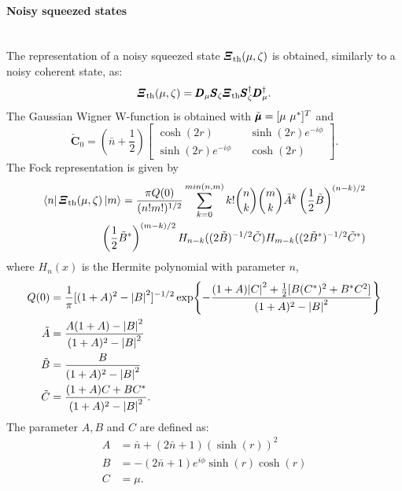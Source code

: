         \paragraph{Noisy squeezed states}\mbox{} \\
        The representation of a noisy squeezed state $\Operator{\varXi}_{\mathrm{th}}(\mu,\zeta)$ is obtained,
        similarly to a noisy coherent state, as:
        \begin{equation}
            \Operator{\varXi}_{\mathrm{th}}(\mu,\zeta)=\Operator{D}_\mu\Operator{S}_\zeta\Operator{\varXi}_{\mathrm{th}}
            \Operator{S}_\zeta^\dagger\Operator{D}_\mu^\dagger.
        \end{equation}
        The Gaussian Wigner W-function is obtained with $\check{\Vector{\mu}}=[\mu\ \mu^*]^T$ and
        \begin{equation}
            \check{\pmb{C}}_0=\left(\bar{n}+\frac{1}{2}\right)
            \begin{bmatrix}
                \cosh(2r) && \sinh(2r)e^{-i\phi}\\
                \sinh(2r)e^{-i\phi} && \cosh(2r)
            \end{bmatrix}.
            \label{eq:WignerSS}
        \end{equation}
        The Fock representation is given by \cite{MarMar_1993}
        \begin{equation}\begin{split}
            \bra{n}\Operator{\varXi}_{\mathrm{th}}(\mu,\zeta)\ket{m}=\frac{\pi Q(0)}{(n!m!)^{1/2}}
            \sum_{k=0}^{min(n,m)} k! \binom{n}{k}\binom{m}{k} \tilde{A}^k\left(\frac{1}{2}
            \tilde{B}\right)^{(n-k)/2}\\ \left(\frac{1}{2}\tilde{B}^*\right)^{(m-k)/2}
            H_{n-k}((2\tilde{B})^{-1/2}\tilde{C}) H_{m-k}((2\tilde{B}^*)^{-1/2}\tilde{C}^*) 
            \label{FR_NSS}
        \end{split}\end{equation}
        where $H_n(x)$ is the Hermite polynomial with parameter $n$,
        \begin{equation}
            \begin{split}
            Q(0) &= \frac{1}{\pi}[(1+A)^2-\absolutevalue{B}^2]^{-1/2}\exp{-\frac{(1+A)\absolutevalue{C}^2
            +\frac{1}{2}[B(C^*)^2+B^*C^2]}{(1+A)^2-\absolutevalue{B}^2}}\\
            \tilde{A} &= \frac{A(1+A)-\absolutevalue{B}^2}{(1+A)^2-\absolutevalue{B}^2}\\
            \tilde{B} &= \frac{B}{(1+A)^2-\absolutevalue{B}^2}\\
            \tilde{C} &= \frac{(1+A)C+BC^*}{(1+A)^2-\absolutevalue{B}^2}.
            \end{split}
        \end{equation}
        The parameter $A,B$ and $C$ are defined as:
        \begin{equation}
            \begin{split}
            A&=\bar{n}+(2\bar{n}+1)(\sinh(r))^2\\
            B&=-(2\bar{n}+1)e^{i\phi}\sinh(r)\cosh(r)\\
            C&=\mu.
            \end{split}
        \end{equation}